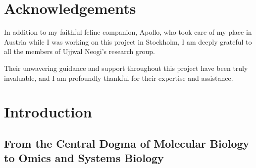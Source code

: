 \documentclass[
  11pt,
]{article}
\begin{document}
\newpage

\section*{Acknowledgements}

In addition to my faithful feline companion, Apollo, who took care of my
place in Austria while I was working on this project in Stockholm, I am
deeply grateful to all the members of Ujjwal Neogi's research group.

Their unwavering guidance and support throughout this project have been
truly invaluable, and I am profoundly thankful for their expertise and
assistance. 

\newpage

\hypertarget{introduction}{%
\section{Introduction}\label{introduction}}

\hypertarget{from-the-central-dogma-of-molecular-biology-to-omics-and-systems-biology}{%
\subsection{From the Central Dogma of Molecular Biology to Omics and
Systems
Biology}\label{from-the-central-dogma-of-molecular-biology-to-omics-and-systems-biology}}
\end{document}

